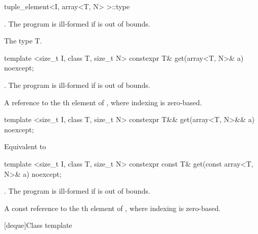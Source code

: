 %
\begin{itemdecl}
tuple_element<I, array<T, N> >::type
\end{itemdecl}

\begin{itemdescr}
\pnum
\requires {}. The program is ill-formed if  is out of bounds.

\pnum
\cvalue  The type T.
\end{itemdescr}

%
%
\begin{itemdecl}
template <size_t I, class T, size_t N>
  constexpr T& get(array<T, N>& a) noexcept;
\end{itemdecl}

\begin{itemdescr}
\pnum
\requires {}. The program is ill-formed if  is out of bounds.

\pnum
\returns  A reference to the th element of ,
where indexing is zero-based.
\end{itemdescr}

%
%
\begin{itemdecl}
template <size_t I, class T, size_t N>
  constexpr T&& get(array<T, N>&& a) noexcept;
\end{itemdecl}

\begin{itemdescr}
\pnum
\effects Equivalent to 
\end{itemdescr}

%
%
\begin{itemdecl}
template <size_t I, class T, size_t N>
  constexpr const T& get(const array<T, N>& a) noexcept;
\end{itemdecl}

\begin{itemdescr}
\pnum
\requires {}. The program is ill-formed if  is out of bounds.

\pnum
\returns A const reference to the th element of ,
where indexing is zero-based.
\end{itemdescr}

[deque]{Class template }

